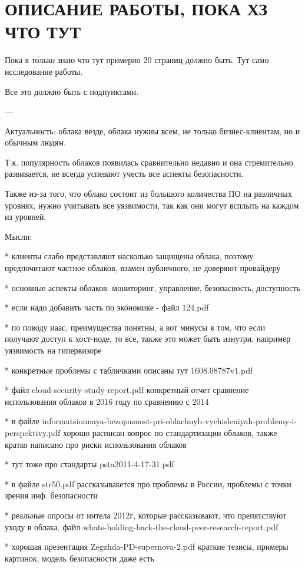 \section{ОПИСАНИЕ РАБОТЫ, ПОКА ХЗ ЧТО ТУТ}

Пока я только знаю что тут примерно 20 страниц должно быть. Тут само исследование работы.

Все это должно быть с подпунктами.

---

Актуальность: облака везде, облака нужны всем, не только бизнес-клиентам, но и обычным людям.

Т.к. популярность облаков появилась сравнительно недавно и она стремительно развивается, не всегда успевают учесть все аспекты безопасности.

Также из-за того, что облако состоит из большого количества ПО на различных уровнях, нужно учитывать все уязвимости, так как они могут всплыть на каждом из уровней.

Мысли:

* клиенты слабо представляют насколько защищены облака, поэтому предпочитают частное облаков, взамен публичного, не доверяют провайдеру

* основные аспекты облаков: мониторинг, управление, безопасность, доступность

* если надо добавить часть по экономике - файл 124.pdf

* по поводу иаас, преимущества понятны, а вот минусы в том, что если получают доступ к хост-ноде, то все, также это может быть изнутри, например уязвимость на гипервизоре

* конкретные проблемы с табличками описаны тут 1608.08787v1.pdf

* файл cloud-security-study-report.pdf конкретный отчет сравнение использования облаков в 2016 году по сравнению с 2014

* в файле informatsionnaya-bezopasnost-pri-oblachnyh-vychisleniyah-problemy-i-perspektivy.pdf хорошо расписан вопрос по стандартизации облаков, также кратко написано про риски использования облаков

* тут тоже про стандарты psta2011-4-17-31.pdf

* в файле str50.pdf рассказывакется про проблемы в России, проблемы с точки зрения инф. безопасности

* реальные опросы от интела 2012г, которые рассказывают, что препятствуют уходу в облака, файл whats-holding-back-the-cloud-peer-research-report.pdf

* хорошая презентация Zegzhda-PD-supernova-2.pdf краткие тезисы, примеры картинок, модель безопасности даже есть

